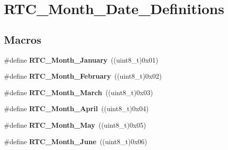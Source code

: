 \hypertarget{group___r_t_c___month___date___definitions}{\section{R\-T\-C\-\_\-\-Month\-\_\-\-Date\-\_\-\-Definitions}
\label{group___r_t_c___month___date___definitions}
}
\subsection*{Macros}
\begin{DoxyCompactItemize}
\item 
\hypertarget{group___r_t_c___month___date___definitions_ga2a33537460ebe3cf38bf5e1cf75df306}{\#define {\bfseries R\-T\-C\-\_\-\-Month\-\_\-\-January}~((uint8\-\_\-t)0x01)}\label{group___r_t_c___month___date___definitions_ga2a33537460ebe3cf38bf5e1cf75df306}

\item 
\hypertarget{group___r_t_c___month___date___definitions_ga00224b67848d0c679f1353373061f400}{\#define {\bfseries R\-T\-C\-\_\-\-Month\-\_\-\-February}~((uint8\-\_\-t)0x02)}\label{group___r_t_c___month___date___definitions_ga00224b67848d0c679f1353373061f400}

\item 
\hypertarget{group___r_t_c___month___date___definitions_ga842c0d17229fc43d4571307b8466e50e}{\#define {\bfseries R\-T\-C\-\_\-\-Month\-\_\-\-March}~((uint8\-\_\-t)0x03)}\label{group___r_t_c___month___date___definitions_ga842c0d17229fc43d4571307b8466e50e}

\item 
\hypertarget{group___r_t_c___month___date___definitions_gabdf30fd0fafd83af7630bc5e653b876e}{\#define {\bfseries R\-T\-C\-\_\-\-Month\-\_\-\-April}~((uint8\-\_\-t)0x04)}\label{group___r_t_c___month___date___definitions_gabdf30fd0fafd83af7630bc5e653b876e}

\item 
\hypertarget{group___r_t_c___month___date___definitions_ga1a14ee22b8202e3faefc9b1d41ae91e6}{\#define {\bfseries R\-T\-C\-\_\-\-Month\-\_\-\-May}~((uint8\-\_\-t)0x05)}\label{group___r_t_c___month___date___definitions_ga1a14ee22b8202e3faefc9b1d41ae91e6}

\item 
\hypertarget{group___r_t_c___month___date___definitions_ga3b02772afa467bf8d1e4ccbc64486506}{\#define {\bfseries R\-T\-C\-\_\-\-Month\-\_\-\-June}~((uint8\-\_\-t)0x06)}\label{group___r_t_c___month___date___definitions_ga3b02772afa467bf8d1e4ccbc64486506}


\end{DoxyCompactItemize}
